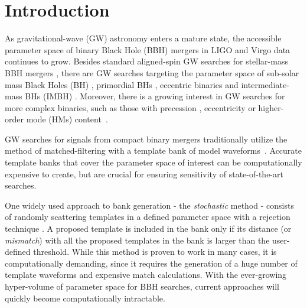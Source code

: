 \documentclass[twocolumn,showpacs,preprintnumbers,nofootinbib,prd,
superscriptaddress,10pt]{revtex4-2}
\begin{document}
\section{Introduction}

As gravitational-wave (GW) astronomy enters a mature state, the accessible parameter space of binary Black Hole (BBH) mergers in LIGO \cite{LIGOScientific:2014pky} and Virgo \cite{VIRGO:2014yos} data continues to grow. Besides standard aligned-spin GW searches for stellar-mass BBH mergers \cite{GWTC-1,GWTC-2,GWTC-2.1, GWTC-3}, there are GW searches targeting the parameter space of sub-solar mass Black Holes (BH) \cite{SSM_O2, SSM_O3a, PhysRevD.106.023024, Nitz:2021mzz}, primordial BHs \cite{PBH}, eccentric binaries \cite{PhysRevD.102.043005, PhysRevD.104.104016, Nitz:2019spj} and intermediate-mass BHs (IMBH) \cite{IMBH_O2, IMBH_O3, Chandra:2022ixv}. Moreover, there is a growing interest in GW searches for more complex binaries, such as those with precession \cite{PhysRevD.89.024010, Harry:2017weg, PhysRevD.102.041302, Indik:2016qky, Harry:2016ijz}, eccentricity \cite{LIGOScientific:2019dag, Ramos-Buades:2020eju, Wang:2021qsu, Nitz:2021mzz} or higher-order mode (HMs) content~\cite{CalderonBustillo:2015lrt, Harry:2017weg, Chandra_hom, 2021PhRvD.103b4042M}.

GW searches for signals from compact binary mergers traditionally utilize the method of matched-filtering with a template bank of model waveforms~\cite{Sathyaprakash:1991mt, Dhurandhar:1992mw, Owen:1998dk, Allen:2005fk, Babak:2006ty, Cokelaer:2007mv}. Accurate template banks that cover the parameter space of interest can be computationally expensive to create, but are crucial for ensuring sensitivity of state-of-the-art searches.

One widely used approach to bank generation - the {\it stochastic} method \cite{Harry:2009ea, PhysRevD.80.104014, Ajith:2012mn} - consists of randomly scattering templates in a defined parameter space with a rejection technique \cite{DalCanton:2017ala, Mukherjee:2018yra, Indik:2016qky, Lenon:2021zac}. A proposed template is included in the bank only if its distance (or {\it mismatch}) with all the proposed templates in the bank is larger than the user-defined threshold.
While this method is proven to work in many cases, it is computationally demanding, since it requires the generation of a huge number of template waveforms and expensive match calculations.
With the ever-growing hyper-volume of parameter space for BBH searches, current approaches will quickly become computationally intractable.
\end{document}
